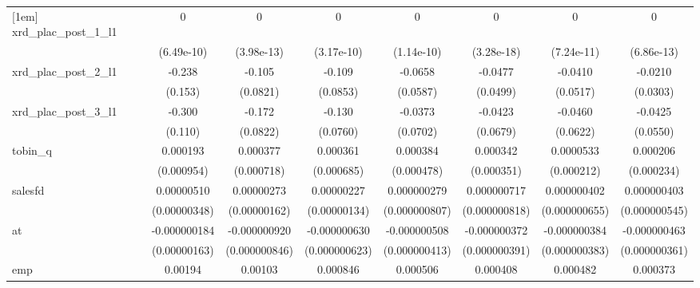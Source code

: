 {\begin{tabular}{l*{7}{c}}
[1em]
xrd\_plac\_post\_1\_l1&           0         &           0         &           0         &           0         &           0         &           0         &           0         \\
            &  (6.49e-10)         &  (3.98e-13)         &  (3.17e-10)         &  (1.14e-10)         &  (3.28e-18)         &  (7.24e-11)         &  (6.86e-13)         \\
[1em]
xrd\_plac\_post\_2\_l1&      -0.238         &      -0.105         &      -0.109         &     -0.0658         &     -0.0477         &     -0.0410         &     -0.0210         \\
            &     (0.153)         &    (0.0821)         &    (0.0853)         &    (0.0587)         &    (0.0499)         &    (0.0517)         &    (0.0303)         \\
[1em]
xrd\_plac\_post\_3\_l1&      -0.300\sym{**} &      -0.172\sym{*}  &      -0.130         &     -0.0373         &     -0.0423         &     -0.0460         &     -0.0425         \\
            &     (0.110)         &    (0.0822)         &    (0.0760)         &    (0.0702)         &    (0.0679)         &    (0.0622)         &    (0.0550)         \\
[1em]
tobin\_q     &    0.000193         &    0.000377         &    0.000361         &    0.000384         &    0.000342         &   0.0000533         &    0.000206         \\
            &  (0.000954)         &  (0.000718)         &  (0.000685)         &  (0.000478)         &  (0.000351)         &  (0.000212)         &  (0.000234)         \\
[1em]
salesfd     &  0.00000510         &  0.00000273         &  0.00000227         & 0.000000279         & 0.000000717         & 0.000000402         & 0.000000403         \\
            &(0.00000348)         &(0.00000162)         &(0.00000134)         &(0.000000807)         &(0.000000818)         &(0.000000655)         &(0.000000545)         \\
[1em]
at          &-0.000000184         &-0.000000920         &-0.000000630         &-0.000000508         &-0.000000372         &-0.000000384         &-0.000000463         \\
            &(0.00000163)         &(0.000000846)         &(0.000000623)         &(0.000000413)         &(0.000000391)         &(0.000000383)         &(0.000000361)         \\
[1em]
emp         &     0.00194\sym{*}  &     0.00103\sym{*}  &    0.000846\sym{*}  &    0.000506         &    0.000408         &    0.000482         &    0.000373         \\

\end{tabular}}
